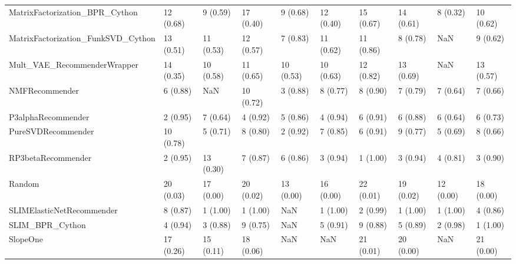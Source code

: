 \begin{tabular}{llllllllll}
     MatrixFactorization\_BPR\_Cython &                12 (0.68) &    9 (0.59) &     17 (0.40) &     9 (0.68) &            12 (0.40) &           15 (0.67) &         14 (0.61) &           8 (0.32) &         10 (0.62) \\
 MatrixFactorization\_FunkSVD\_Cython &                13 (0.51) &   11 (0.53) &     12 (0.57) &     7 (0.83) &            11 (0.62) &           11 (0.86) &          8 (0.78) &                NaN &          9 (0.62) \\
        Mult\_VAE\_RecommenderWrapper &                14 (0.35) &   10 (0.58) &     11 (0.65) &    10 (0.53) &            10 (0.63) &           12 (0.82) &         13 (0.69) &                NaN &         13 (0.57) \\
                     NMFRecommender &                 6 (0.88) &         NaN &     10 (0.72) &     3 (0.88) &             8 (0.77) &            8 (0.90) &          7 (0.79) &           7 (0.64) &          7 (0.66) \\
                 P3alphaRecommender &                 2 (0.95) &    7 (0.64) &      4 (0.92) &     5 (0.86) &             4 (0.94) &            6 (0.91) &          6 (0.88) &           6 (0.64) &          6 (0.73) \\
                 PureSVDRecommender &                10 (0.78) &    5 (0.71) &      8 (0.80) &     2 (0.92) &             7 (0.85) &            6 (0.91) &          9 (0.77) &           5 (0.69) &          8 (0.66) \\
                 RP3betaRecommender &                 2 (0.95) &   13 (0.30) &      7 (0.87) &     6 (0.86) &             3 (0.94) &            1 (1.00) &          3 (0.94) &           4 (0.81) &          3 (0.90) \\
                             Random &                20 (0.03) &   17 (0.00) &     20 (0.02) &    13 (0.00) &            16 (0.00) &           22 (0.01) &         19 (0.02) &          12 (0.00) &         18 (0.00) \\
          SLIMElasticNetRecommender &                 8 (0.87) &    1 (1.00) &      1 (1.00) &          NaN &             1 (1.00) &            2 (0.99) &          1 (1.00) &           1 (1.00) &          4 (0.86) \\
                    SLIM\_BPR\_Cython &                 4 (0.94) &    3 (0.88) &      9 (0.75) &          NaN &             5 (0.91) &            9 (0.88) &          5 (0.89) &           2 (0.98) &          1 (1.00) \\
                           SlopeOne &                17 (0.26) &   15 (0.11) &     18 (0.06) &          NaN &                  NaN &           21 (0.01) &         20 (0.00) &                NaN &         21 (0.00) \\

\end{tabular}
